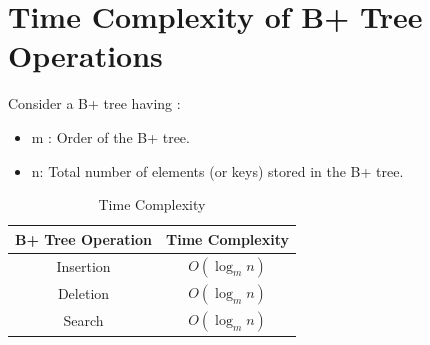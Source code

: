 \documentclass{article}
\begin{document}
\section{Time Complexity of B+ Tree Operations}
Consider a B+ tree having :
\begin{itemize}
    \item m : Order of the B+ tree.
    \item n: Total number of elements (or keys) stored in the B+ tree.
\end{itemize}
\begin{table}[ht]
        \centering
        \small %
        \setlength{\tabcolsep}{10pt} %
        \renewcommand{\arraystretch}{1.5} %
        \begin{tabular}{|c|c|}
            \hline
            \textbf{B+ Tree Operation} & \textbf{Time Complexity}  \\
            \hline
            {Insertion} & {$O(\log_m n)$}\\
            \hline
            {Deletion} & {$O(\log_m n)$}\\
            \hline
            {Search} & {$O(\log_m n)$}\\
            \hline
        \end{tabular}
        \caption{Time Complexity}
    \end{table}
\end{document}
